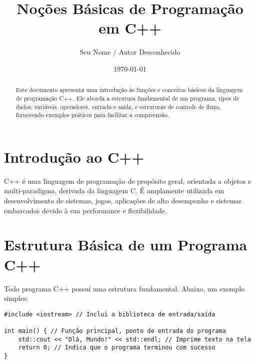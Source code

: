 \documentclass{article}
\title{Noções Básicas de Programação em C++}
\author{Seu Nome / Autor Desconhecido}
\date{\today}
\begin{document}
\maketitle

\begin{abstract}
Este documento apresenta uma introdução às funções e conceitos básicos da linguagem de programação C++. Ele aborda a estrutura fundamental de um programa, tipos de dados, variáveis, operadores, entrada e saída, e estruturas de controle de fluxo, fornecendo exemplos práticos para facilitar a compreensão.
\end{abstract}

\section{Introdução ao C++}
C++ é uma linguagem de programação de propósito geral, orientada a objetos e multi-paradigma, derivada da linguagem C. É amplamente utilizada em desenvolvimento de sistemas, jogos, aplicações de alto desempenho e sistemas embarcados devido à sua performance e flexibilidade.

\section{Estrutura Básica de um Programa C++}
Todo programa C++ possui uma estrutura fundamental. Abaixo, um exemplo simples:

\begin{lstlisting}[caption={Estrutura Básica}]
#include <iostream> // Inclui a biblioteca de entrada/saída

int main() { // Função principal, ponto de entrada do programa
    std::cout << "Olá, Mundo!" << std::endl; // Imprime texto na tela
    return 0; // Indica que o programa terminou com sucesso
}
\end{lstlisting}
\end{document}
